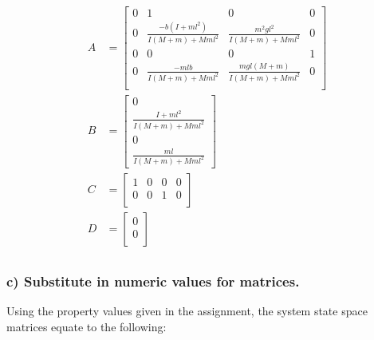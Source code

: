 \documentclass[12pt, letterpaper, onecolumn]{article}
\begin{document}
\begin{equation*}
    \begin{split}
        A & =
        \begin{bmatrix}
            0 & 1                               & 0                             & 0 \\
            0 & \frac{-b(I+ml^2)}{I(M+m)+Mml^2} & \frac{m^2gl^2}{I(M+m)+Mml^2}  & 0 \\
            0 & 0                               & 0                             & 1 \\
            0 & \frac{-mlb}{I(M+m)+Mml^2}       & \frac{mgl(M+m)}{I(M+m)+Mml^2} & 0 \\
        \end{bmatrix} \\
        B & =
        \begin{bmatrix}
            0                           \\
            \frac{I+ml^2}{I(M+m)+Mml^2} \\
            0                           \\
            \frac{ml}{I(M+m)+Mml^2}
        \end{bmatrix} \\
        C & =
        \begin{bmatrix}
            1 & 0 & 0 & 0 \\
            0 & 0 & 1 & 0 \\
        \end{bmatrix} \\
        D & =
        \begin{bmatrix}
            0 \\
            0 \\
        \end{bmatrix} \\
    \end{split}
\end{equation*}

\subsubsection*{c) Substitute in numeric values for matrices.}
Using the property values given in the assignment, the system state space matrices equate to the following:
\end{document}
